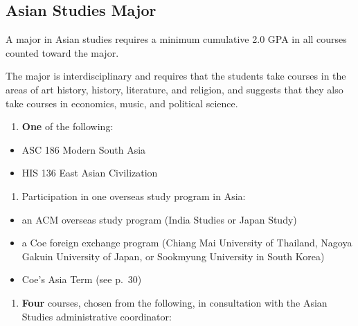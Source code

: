 \documentclass[
  letterpaper,
]{scrbook}
\providecommand{\tightlist}{%
  \setlength{\itemsep}{0pt}\setlength{\parskip}{0pt}}
\begin{document}
\subsection{Asian Studies Major}\label{asian-studies-major}

A major in Asian studies requires a minimum cumulative 2.0 GPA in all
courses counted toward the major.

The major is interdisciplinary and requires that the students take
courses in the areas of art history, history, literature, and religion,
and suggests that they also take courses in economics, music, and
political science.

\begin{enumerate}
\def\labelenumi{\arabic{enumi}.}
\tightlist
\item
  \textbf{One} of the following:
\end{enumerate}

\begin{itemize}
\tightlist
\item
  ASC 186 Modern South Asia
\item
  HIS 136 East Asian Civilization
\end{itemize}

\begin{enumerate}
\def\labelenumi{\arabic{enumi}.}
\setcounter{enumi}{1}
\tightlist
\item
  Participation in one overseas study program in Asia:
\end{enumerate}

\begin{itemize}
\tightlist
\item
  an ACM overseas study program (India Studies or Japan Study)
\item
  a Coe foreign exchange program (Chiang Mai University of Thailand,
  Nagoya Gakuin University of Japan, or Sookmyung University in South
  Korea)
\item
  Coe's Asia Term (see p.~30)
\end{itemize}

\begin{enumerate}
\def\labelenumi{\arabic{enumi}.}
\setcounter{enumi}{2}
\tightlist
\item
  \textbf{Four} courses, chosen from the following, in consultation with
  the Asian Studies administrative coordinator:
\end{enumerate}
\end{document}
